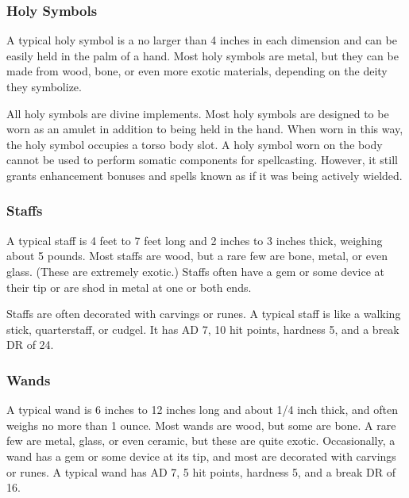         \subsubsection{Holy Symbols}

             A typical holy symbol is a no larger than 4 inches in each dimension and can be easily held in the palm of a hand.
            Most holy symbols are metal, but they can be made from wood, bone, or even more exotic materials, depending on the deity they symbolize.

             All holy symbols are divine implements.
            Most holy symbols are designed to be worn as an amulet in addition to being held in the hand.
            When worn in this way, the holy symbol occupies a torso body slot.
            A holy symbol worn on the body cannot be used to perform somatic components for spellcasting.
            However, it still grants enhancement bonuses and spells known as if it was being actively wielded.

        \subsubsection{Staffs}

             A typical staff is 4 feet to 7 feet long and 2 inches to 3 inches thick, weighing about 5 pounds.
            Most staffs are wood, but a rare few are bone, metal, or even glass.
            (These are extremely exotic.)
            Staffs often have a gem or some device at their tip or are shod in metal at one or both ends.

            Staffs are often decorated with carvings or runes.
            A typical staff is like a walking stick, quarterstaff, or cudgel.
            It has AD 7, 10 hit points, hardness 5, and a break DR of 24.

        \subsubsection{Wands}

             A typical wand is 6 inches to 12 inches long and about 1/4 inch thick, and often weighs no more than 1 ounce.
            Most wands are wood, but some are bone.
            A rare few are metal, glass, or even ceramic, but these are quite exotic.
            Occasionally, a wand has a gem or some device at its tip, and most are decorated with carvings or runes.
            A typical wand has AD 7, 5 hit points, hardness 5, and a break DR of 16.

